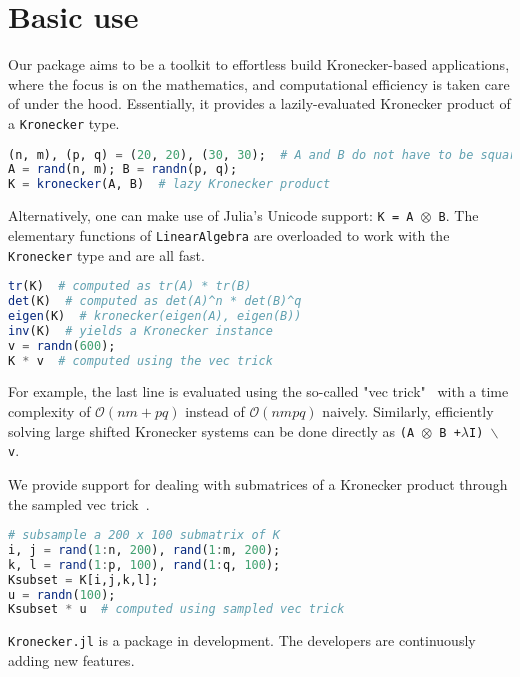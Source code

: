 \documentclass{juliacon}
\begin{document}
\section{Basic use}

Our package aims to be a toolkit to effortless build Kronecker-based applications, where the focus is on the mathematics, and computational efficiency is taken care of under the hood. Essentially, it provides a lazily-evaluated Kronecker product of a \texttt{Kronecker} type.

\begin{lstlisting}[language = Julia]
(n, m), (p, q) = (20, 20), (30, 30);  # A and B do not have to be square
A = rand(n, m); B = randn(p, q);
K = kronecker(A, B)  # lazy Kronecker product
\end{lstlisting}

Alternatively, one can make use of Julia's Unicode support: \texttt{K = A $\otimes$ B}.
The elementary functions of \texttt{LinearAlgebra} are overloaded to work with the \texttt{Kronecker} type and are all fast.

\begin{lstlisting}[language = Julia]
tr(K)  # computed as tr(A) * tr(B)
det(K)  # computed as det(A)^n * det(B)^q
eigen(K)  # kronecker(eigen(A), eigen(B))
inv(K)  # yields a Kronecker instance
v = randn(600);
K * v  # computed using the vec trick
\end{lstlisting}

For example, the last line is evaluated using the so-called "vec trick"~\cite{VanLoan2000} with a time complexity of $\mathcal{O}(nm+pq)$ instead of $\mathcal{O}(nmpq)$ naively.
Similarly, efficiently solving large shifted Kronecker systems can be done directly as \texttt{(A $\otimes$ B +$\lambda$I) $\backslash$ v}.

We provide support for dealing with submatrices of a Kronecker product through the sampled vec trick~\cite{Airola2017genvectric}.

\begin{lstlisting}[language = Julia]
# subsample a 200 x 100 submatrix of K
i, j = rand(1:n, 200), rand(1:m, 200);
k, l = rand(1:p, 100), rand(1:q, 100);
Ksubset = K[i,j,k,l];
u = randn(100);
Ksubset * u  # computed using sampled vec trick
\end{lstlisting}

\texttt{Kronecker.jl} is a package in development. The developers are continuously adding new features.
\end{document}

